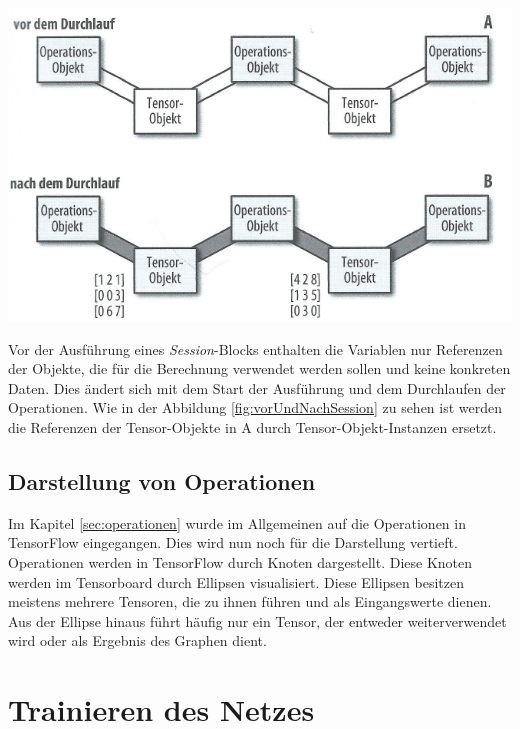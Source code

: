 \begin{center}
\includegraphics[width=.6\textwidth]{../abbildungen/3-4.pdf}
	\label{fig:vorUndNachSession}
\end{center}
Vor der Ausführung eines \textit{Session}-Blocks enthalten die Variablen nur Referenzen der Objekte, die für die Berechnung verwendet werden sollen und keine konkreten Daten. Dies ändert sich mit dem Start der Ausführung und dem Durchlaufen der Operationen. Wie in der Abbildung \ref{fig:vorUndNachSession} zu sehen ist werden die Referenzen der Tensor-Objekte in A durch Tensor-Objekt-Instanzen ersetzt.

\subsection{Darstellung von Operationen}
\label{sec:darstellungOperationen}
Im Kapitel \ref{sec:operationen} wurde im Allgemeinen auf die Operationen in TensorFlow eingegangen. Dies wird nun noch für die Darstellung vertieft. Operationen werden in TensorFlow durch Knoten dargestellt. Diese Knoten werden im Tensorboard durch Ellipsen visualisiert. Diese Ellipsen besitzen meistens mehrere Tensoren, die zu ihnen führen und als Eingangswerte dienen. Aus der Ellipse hinaus führt häufig nur ein Tensor, der entweder weiterverwendet wird oder als Ergebnis des Graphen dient. 





\section{Trainieren des Netzes}
\label{sec:trainierenDesNetzes}
\printsubchapterauthor{\authorNiklas}
